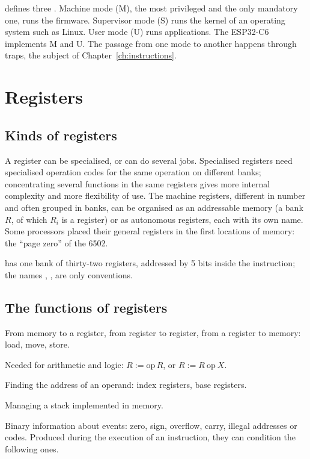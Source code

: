 \riscv defines three . Machine mode (M), the most
privileged and the only mandatory one, runs the firmware. Supervisor mode
(S) runs the kernel of an operating system such as Linux. User mode (U) runs
applications. The ESP32-C6 implements M and U. The passage from one mode to
another happens through traps, the subject of Chapter~\ref{ch:instructions}.

\section{Registers}

\subsection{Kinds of registers}

A register can be specialised, or can do several jobs. Specialised registers
need specialised operation codes for the same operation on different banks;
concentrating several functions in the same registers gives more internal
complexity and more flexibility of use. The machine registers, different in
number and often grouped in banks, can be organised as an addressable memory
(a bank $R$, of which $R_i$ is a register) or as autonomous registers, each
with its own name. Some processors placed their general registers in the
first locations of memory: the ``page zero'' of the 6502.

\riscv has one bank of thirty-two registers, addressed by 5 bits inside the
instruction; the names , ,  are only conventions.

\subsection{The functions of registers}

\begin{description}[style=nextline,leftmargin=1.5em]
\item[Transit of data.] From memory to a register, from register to register,
  from a register to memory: load, move, store.
\item[Accumulation of results.] Needed for arithmetic and logic:
  $R:=\mathrm{op}\,R$, or $R:=R\ \mathrm{op}\ X$.
\item[Addressing.] Finding the address of an operand: index registers, base
  registers.
\item[Stack pointers.] Managing a stack implemented in memory.
\item[Indicators, or flags.] Binary information about events: zero, sign,
  overflow, carry, illegal addresses or codes. Produced during the execution
  of an instruction, they can condition the following ones.
\end{description}

